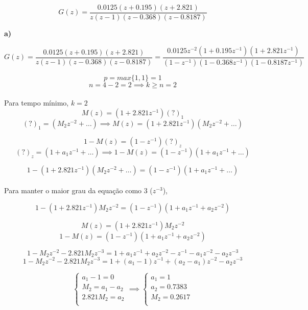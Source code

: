 \documentclass{article}
\begin{document}
    $$ G(z) = \frac{ 0.0125(z+0.195)(z+2.821) } { z(z-1)(z-0.368)(z-0.8187) } $$

    {\textbf{a)}}

    $$ G(z) = \frac{ 0.0125(z+0.195)(z+2.821) } { z(z-1)(z-0.368)(z-0.8187) } = \frac{ 0.0125z^{-2}(1+0.195z^{-1})(1+2.821z^{-1}) } { (1-z^{-1})(1-0.368z^{-1})(1-0.8187z^{-1}) } $$

    $$ p = max\{ 1,1 \} = 1 $$
    $$ n = 4-2 = 2 \implies k \geq n = 2 $$\\[0.1cm]

    {Para tempo mínimo, $ k=2 $}\\[0.1cm]

    $$ M(z) = (1+2.821z^{-1})(?)_1 $$
    $$ (?)_1 = (M_2 z^{-2} + \dots) \implies M(z) = (1+2.821z^{-1})(M_2 z^{-2} + \dots) $$


    $$ 1-M(z) = (1-z^{-1})(?)_z $$
    $$ (?)_z = (1+ a_1 z^{-1} + \dots) \implies 1-M(z) = (1-z^{-1})(1+ a_1 z^{-1} + \dots) $$

    $$ 1- (1+2.821z^{-1})(M_2 z^{-2} + \dots) = (1-z^{-1})(1+ a_1 z^{-1} + \dots) $$\\[0.1cm]

    {Para manter o maior grau da equação como 3 ($z^{-3}$),}

    $$ 1- (1+2.821z^{-1})M_2 z^{-2} = (1-z^{-1})(1+ a_1 z^{-1} + a_2 z^{-2}) $$

    $$ M(z) = (1+2.821z^{-1})M_2 z^{-2} $$
    $$ 1-M(z) = (1-z^{-1})(1+ a_1 z^{-1} + a_2 z^{-2}) $$

    $$ 1 - M_2 z^{-2} - 2.821M_2 z^{-3} = 1 + a_1 z^{-1} + a_2 z^{-2} - z^{-1} - a_1 z^{-2} - a_2 z^{-3} $$
    $$ 1 - M_2 z^{-2} - 2.821M_2 z^{-3} = 1 + (a_1 -1)z^{-1} + (a_2 - a_1)z^{-2} - a_2 z^{-3} $$

    \[
        \begin{cases}
            a_1 - 1 = 0\\
            M_2 = a_1 - a_2\\
            2.821M_2 = a_2\\
        \end{cases}
        \implies
        \begin{cases}
            a_1 = 1\\
            a_2 = 0.7383\\
            M_2 = 0.2617\\
        \end{cases}
    \]\\

    \clearpage
\end{document}
